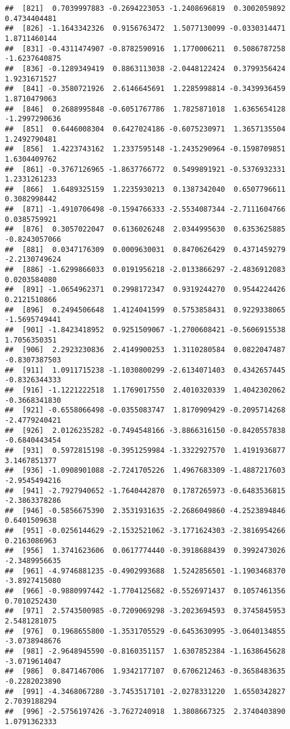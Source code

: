 \documentclass[
]{article}
\begin{document}
\begin{verbatim}
##  [821]  0.7039997883 -0.2694223053 -1.2408696819  0.3002059892  0.4734404481
##  [826] -1.1643342326  0.9156763472  1.5077130099 -0.0330314471  1.8711460144
##  [831] -0.4311474907 -0.8782590916  1.1770006211  0.5086787258 -1.6237640875
##  [836] -0.1289349419  0.8863113038 -2.0448122424  0.3799356424  1.9231671527
##  [841] -0.3580721926  2.6146645691  1.2285998814 -0.3439936459  1.8710479063
##  [846]  0.2688995848 -0.6051767786  1.7825871018  1.6365654128 -1.2997290636
##  [851]  0.6446008304  0.6427024186 -0.6075230971  1.3657135504  1.2492790481
##  [856]  1.4223743162  1.2337595148 -1.2435290964 -0.1598709851  1.6304409762
##  [861] -0.3767126965 -1.8637766772  0.5499891921 -0.5376932331  1.2331261233
##  [866]  1.6489325159  1.2235930213  0.1387342040  0.6507796611  0.3082998442
##  [871] -1.4910706498 -0.1594766333 -2.5534087344 -2.7111604766  0.0385759921
##  [876]  0.3057022047  0.6136026248  2.0344995630  0.6353625885 -0.8243057066
##  [881]  0.0347176309  0.0009630031  0.8470626429  0.4371459279 -2.2130749624
##  [886] -1.6299866033  0.0191956218 -2.0133866297 -2.4836912083  0.0203584080
##  [891] -1.0654962371  0.2998172347  0.9319244270  0.9544224426  0.2121510866
##  [896]  0.2494506648  1.4124041599  0.5753858431  0.9229338065 -1.5695749441
##  [901] -1.8423418952  0.9251509067 -1.2700608421 -0.5606915538  1.7056350351
##  [906]  2.2923230836  2.4149900253  1.3110280584  0.0822047487 -0.8307387503
##  [911]  1.0911715238 -1.1030800299 -2.6134071403  0.4342657445 -0.8326344333
##  [916] -1.1221222518  1.1769017550  2.4010320339  1.4042302062 -0.3668341830
##  [921] -0.6558066498 -0.0355083747  1.8170909429 -0.2095714268 -2.4779240421
##  [926]  2.0126235282 -0.7494548166 -3.8866316150 -0.8420557838 -0.6840443454
##  [931]  0.5972815198 -0.3951259984 -1.3322927570  1.4191936877  3.1467851377
##  [936] -1.0908901088 -2.7241705226  1.4967683309 -1.4887217603 -2.9545494216
##  [941] -2.7927940652 -1.7640442870  0.1787265973 -0.6483536815 -2.3863378286
##  [946] -0.5856675390  2.3531931635 -2.2686049860 -4.2523894846  0.6401509638
##  [951] -0.0256144629 -2.1532521062 -3.1771624303 -2.3816954266  0.2163086963
##  [956]  1.3741623606  0.0617774440 -0.3918688439  0.3992473026 -2.3489956635
##  [961] -4.9746881235 -0.4902993688  1.5242856501 -1.1903468370 -3.8927415080
##  [966] -0.9880997442 -1.7704125682 -0.5526971437  0.1057461356  0.7010252430
##  [971]  2.5743500985 -0.7209069298 -3.2023694593  0.3745845953  2.5481281075
##  [976]  0.1968655800 -1.3531705529 -0.6453630995 -3.0640134855 -3.0738948676
##  [981] -2.9648945590 -0.8160351157  1.6307852384 -1.1638645628 -3.0719614047
##  [986]  0.8471467006  1.9342177107  0.6706212463 -0.3658483635 -0.2282023890
##  [991] -4.3468067280 -3.7453517101 -2.0278331220  1.6550342827  2.7039188294
##  [996] -2.5756197426 -3.7627240918  1.3808667325  2.3740403890  1.0791362333
\end{verbatim}
\end{document}
